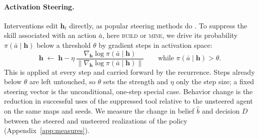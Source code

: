 \paragraph{Activation Steering.}
\label{sec:steering}
Interventions edit $\mathbf{h}_t$ directly, as popular steering methods do \citep{turner2023actadd,rimsky2024caa,zou2023repe}. To suppress the skill
associated with an action $\bar a$, here \textsc{build} or \textsc{mine}, we
drive its probability $\pi(\bar a\mid\mathbf{h})$ below a threshold $\theta$ by
gradient steps in activation space:
\begin{equation}
\mathbf{h}\;\leftarrow\;\mathbf{h}-\eta\,
\frac{\nabla_{\mathbf{h}}\log \pi(\bar a\mid\mathbf{h})}{\lVert\nabla_{\mathbf{h}}\log \pi(\bar a\mid\mathbf{h})\rVert}
\qquad\text{while } \pi(\bar a\mid\mathbf{h})>\theta.
\label{eq:clamp}
\end{equation}
This is applied at every step and carried forward by the recurrence. Steps already
below $\theta$ are left untouched, so $\theta$ sets the strength and $\eta$
only the step size; a fixed steering vector is the unconditional, one-step
special case. Behavior change is the
reduction in successful uses of the suppressed tool relative to the unsteered
agent on the same maps and seeds. We measure the change in belief $\hat b$
and decision $D$ between the steered and unsteered realizations of the policy
(Appendix~\ref{app:measures}).